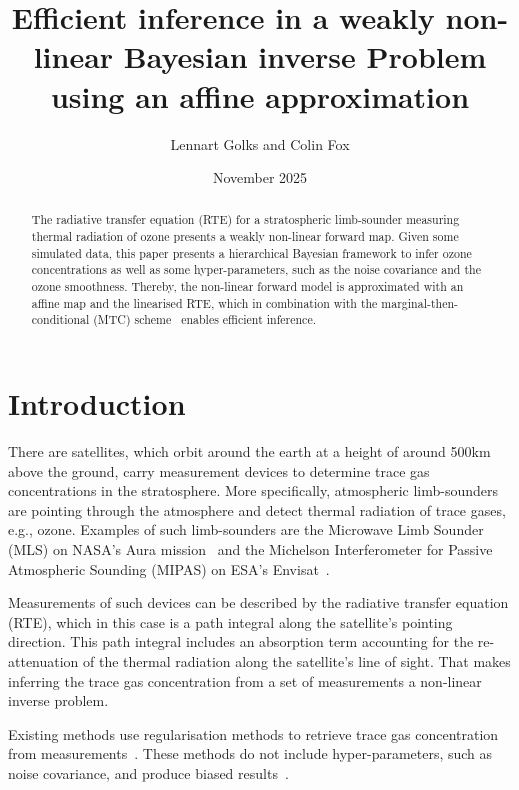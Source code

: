 \documentclass{article}
\title{Efficient inference in a weakly non-linear Bayesian inverse Problem using an affine approximation}
\author{Lennart Golks and Colin Fox}
\date{November 2025}
\begin{document}
\maketitle
\begin{abstract}
The radiative transfer equation (RTE) for a stratospheric limb-sounder measuring thermal radiation of ozone presents a weakly non-linear forward map.
Given some simulated data, this paper presents a hierarchical Bayesian framework to infer ozone concentrations as well as some hyper-parameters, such as the noise covariance and the ozone smoothness.
Thereby, the non-linear forward model is approximated with an affine map and the linearised RTE, which in combination with the marginal-then-conditional (MTC) scheme~\cite{fox2016fast} enables efficient inference.


\end{abstract}

\section{Introduction}
There are satellites, which orbit around the earth at a height of around 500km above the ground, carry measurement devices to determine trace gas concentrations in the stratosphere.
More specifically, atmospheric limb-sounders are pointing through the atmosphere and detect thermal radiation of trace gases, e.g., ozone.
Examples of such limb-sounders are the Microwave
Limb Sounder (MLS) on NASA’s Aura mission~\cite{waters2006earth} and the
Michelson Interferometer for Passive Atmospheric Sounding
(MIPAS) on ESA’s Envisat~\cite{readings2000envisat}.

Measurements of such devices can be described by the radiative transfer equation (RTE), which in this case is a path integral along the satellite's pointing direction.
This path integral includes an absorption term accounting for the re-attenuation of the thermal radiation along the satellite's line of sight.
That makes inferring the trace gas concentration from a set of measurements a non-linear inverse problem.

Existing methods use regularisation methods to retrieve trace gas concentration from measurements~\cite{rodgers1976retrieval, livesey2006retrieval, raspollini2021level}.
These methods do not include hyper-parameters, such as noise covariance, and produce biased results~\cite{Froidevaux2008snrozone}.
\end{document}
